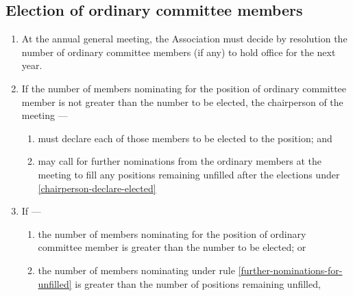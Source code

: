 \documentclass[../constitution.tex]{subfiles}
\begin{document}
\hypertarget{election-of-ordinary-committee-members}{%
\subsection{Election of ordinary committee members}\label{election-of-ordinary-committee-members}}


\begin{enumerate}

\item At the annual general meeting, the Association must decide by resolution the number of ordinary committee members (if any) to hold office for the next year. 
\item If the number of members nominating for the position of ordinary committee member is not greater than the number to be elected, the chairperson of the meeting --- \label{nominating-committee-less-than-elected}

  \begin{enumerate}
  
  \item must declare each of those members to be elected to the position; and \label{chairperson-declare-elected}
  \item may call for further nominations from the ordinary members at the meeting to fill any positions remaining unfilled after the elections under  \ref{chairperson-declare-elected} \label{further-nominations-for-unfilled}
  \end{enumerate}
\item If ---

  \begin{enumerate}
  
  \item the number of members nominating for the position of ordinary committee member is greater than the number to be elected; or
  \item the number of members nominating under rule \ref{further-nominations-for-unfilled} is greater than the number of positions remaining unfilled,
  \end{enumerate}


\end{enumerate}
\end{document}
